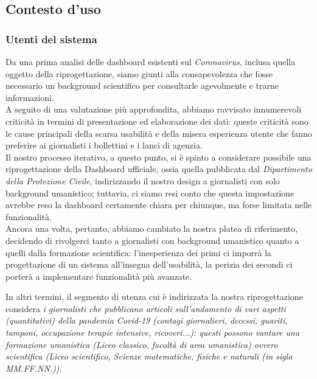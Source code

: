 \subsection{Contesto d'uso}
\subsubsection{Utenti del sistema}
Da una prima analisi delle dashboard esistenti sul \textit{Coronavirus}, inclusa quella oggetto della riprogettazione, siamo giunti alla consapevolezza che fosse necessario un background scientifico per consultarle agevolmente e trarne informazioni.\\
A seguito di una valutazione più approfondita, abbiamo ravvisato innumerevoli criticità in termini di presentazione ed elaborazione dei dati: queste criticità sono le cause principali della scarsa usabilità e della misera esperienza utente che  fanno preferire ai giornalisti i bollettini e i lanci di agenzia.\\
Il nostro processo iterativo, a questo punto, si è spinto a considerare possibile una riprogettazione della Dashboard ufficiale, ossia quella pubblicata dal \textit{Dipartimento della Protezione Civile}, indirizzando il nostro design a giornalisti con solo background umanistico; tuttavia, ci siamo resi conto che questa impostazione avrebbe reso la dashboard certamente chiara per chiunque, ma forse limitata nelle funzionalità.\\ 
Ancora una volta, pertanto, abbiamo cambiato la nostra platea di riferimento, decidendo di rivolgerci tanto a giornalisti con background umanistico quanto a quelli dalla formazione scientifica: l'inesperienza dei primi ci imporrà la progettazione di un sistema all'insegna dell'usabilità, la perizia dei secondi ci porterà a implementare funzionalità più avanzate.

In altri termini, il segmento di utenza cui è indirizzata la nostra riprogettazione considera \emph{i giornalisti che pubblicano articoli sull'andamento di vari aspetti (quantitativi) della pandemia Covid-19 (contagi giornalieri, decessi, guariti, tamponi, occupazione terapie intensive, ricoveri...): questi possono vantare una formazione umanistica (Liceo classico, facoltà di area umanistica) ovvero scientifica (Liceo scientifico, Scienze matematiche, fisiche e naturali (in sigla MM.FF.NN.)).}

